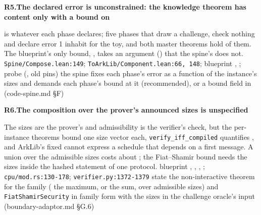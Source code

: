 \par\medskip\noindent\textbf{R5.}\enspace\textbf{The declared error is unconstrained: the knowledge theorem has content only with a bound on }\par\nopagebreak
{}  is whatever each phase declares; five phases that draw a challenge, check nothing and declare error 1 inhabit  for the toy, and both master theorems hold of them. The blueprint's only bound, , takes an argument () that the spine's  does not.
 \texttt{Spine/\allowbreak{}Compose.\allowbreak{}lean:\allowbreak{}149}; \texttt{To\allowbreak{}Ark\allowbreak{}Lib/\allowbreak{}Component.\allowbreak{}lean:\allowbreak{}66,\allowbreak{} 148}; blueprint , ; probe  (, old pins)
 the spine fixes each phase's error as a function  of the instance's sizes and demands each phase's bound at it (recommended), or a bound field in  (code-spine.md §F)

\par\medskip\noindent\textbf{R6.}\enspace\textbf{The composition over the prover's announced sizes is unspecified}\par\nopagebreak
{} The sizes are the prover's and admissibility is the verifier's check, but the per-instance theorems bound one size vector each, \texttt{verify\_\allowbreak{}iff\_\allowbreak{}compiled} quantifies , and ArkLib's fixed  cannot express a schedule that depends on a first message. A union over the admissible sizes costs about ; the  Fiat–Shamir bound needs the sizes inside the hashed statement of one protocol.
 blueprint , , , ; \texttt{cpu/\allowbreak{}mod.\allowbreak{}rs:\allowbreak{}130-\allowbreak{}178}; \texttt{verifier.\allowbreak{}py:\allowbreak{}1372-\allowbreak{}1379}
 state the non-interactive theorem for the family ( the maximum, or the sum, over admissible sizes) and \texttt{Fiat\allowbreak{}Shamir\allowbreak{}Security} in family form with the sizes in the challenge oracle's input (boundary-adaptor.md §G.6)

